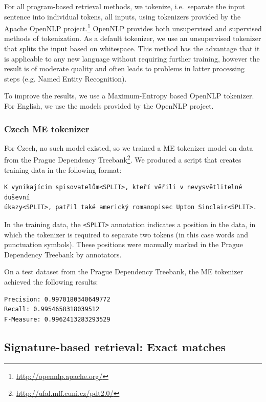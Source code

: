For all program-based retrieval methods, we tokenize, i.e.\ separate the input sentence into individual tokens,
all inputs, using tokenizers provided by the Apache OpenNLP project.\footnote{\url{http://opennlp.apache.org/}}
OpenNLP provides both unsupervised and supervised methods of tokenization. 
As a default tokenizer, we use an unsupervised tokenizer that splits the input
based on whitespace. This method has the advantage that it is applicable to any new
language without requiring further training, however the result is of moderate
quality and often leads to problems in latter processing steps (e.g. Named Entity Recognition).

To improve the results, we use a Maximum-Entropy based OpenNLP tokenizer. For English, we use the
models provided by the OpenNLP project. 


\subsubsection*{Czech ME tokenizer}

For Czech, no such model existed, so we trained a ME tokenizer
model on data from the Prague Dependency Treebank\footnote{\url{http://ufal.mff.cuni.cz/pdt2.0/}}. We produced a script that creates training data in the following format:
\begin{verbatim}
K vynikajícím spisovatelům<SPLIT>, kteří věřili v nevysvětlitelné duševní 
úkazy<SPLIT>, patřil také americký romanopisec Upton Sinclair<SPLIT>.
\end{verbatim}

In the training data, the \verb|<SPLIT>| annotation indicates a position in the data, in which the
tokenizer is required to separate two tokens (in this case words and punctuation symbols). These
positions were manually marked in the Prague Dependency Treebank by annotators.

On a test dataset from the Prague Dependency Treebank, the ME tokenizer achieved the following results:

\begin{lstlisting}
Precision: 0.9970180340649772
Recall: 0.9954658318039512
F-Measure: 0.9962413283293529
\end{lstlisting}




\subsection{Signature-based retrieval: Exact matches}

